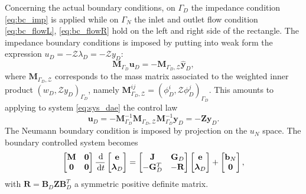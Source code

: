 \documentclass{ifacconf}
\begin{document}
Concerning the actual boundary conditions, on $\Gamma_D$ the impedance condition \eqref{eq:bc_imp} is applied while on  $\Gamma_N$ the inlet and outlet flow condition \eqref{eq:bc_flowL}, \eqref{eq:bc_flowR} hold on the left and right side of the rectangle. The impedance boundary conditions is imposed by putting into weak form the expression $u_D=-\mathcal{Z}\lambda_D=-\mathcal{Z}y_D$:
\[ \mathbf{M}_{\Gamma_D} \mathbf{u}_D = - \mathbf{M}_{\Gamma_D, \mathcal{Z}} \widehat{\mathbf{y}}_D,
\]
where $\mathbf{M}_{\Gamma_D, \mathcal{Z}}$ corresponds to the mass matrix associated to the weighted inner product $\left(w_D, \mathcal{Z}  y_D\right)_{\Gamma_D}$, namely $\mathbf{M}_{\Gamma_D, \mathcal{Z}}^{ij} = \left(\phi_D^i, \mathcal{Z}  \phi_D^j \right)_{\Gamma_D}$. This amounts to applying to system \eqref{eq:sys_dae} the control law
\[ \mathbf{u}_D = - \mathbf{M}_{\Gamma_D}^{-1} \mathbf{M}_{\Gamma_D, \mathcal{Z}} \mathbf{M}_{\Gamma_D}^{-1} \mathbf{y}_D = -\mathbf{Z} \mathbf{y}_D.
\]
The Neumann boundary condition is imposed by projection on the $u_N$ space.   The boundary controlled system becomes   
\begin{equation}
\label{eq:sys_dae}
\begin{bmatrix}
\mathbf{M} & \mathbf{0} \\
\mathbf{0} & \mathbf{0} \\
\end{bmatrix} \frac{\,\mathrm{d}}{\,\mathrm{d} t}
\begin{bmatrix}
\mathbf{e}\\
\bm{\lambda}_D \\
\end{bmatrix}
= \begin{bmatrix}
\mathbf{J} & \mathbf{G}_D\\
-\mathbf{G}_D^T & -\mathbf{R} \\
\end{bmatrix}
\begin{bmatrix}
\mathbf{e}\\
\bm{\lambda}_D \\
\end{bmatrix} + \begin{bmatrix}
\mathbf{b}_N \\
\mathbf{0} \\
\end{bmatrix},
\end{equation}
with $\mathbf{R} = \mathbf{B}_D \mathbf{Z} \mathbf{B}_D^T$ a symmetric positive definite matrix. 
\end{document}
